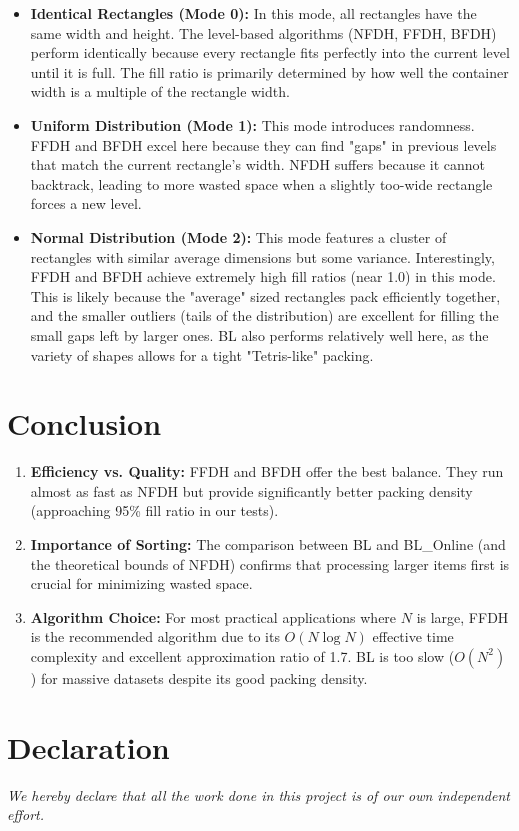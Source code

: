 \documentclass[a4paper,12pt]{article}
\begin{document}
\begin{itemize}
    \item \textbf{Identical Rectangles (Mode 0):} 
    In this mode, all rectangles have the same width and height. The level-based algorithms (NFDH, FFDH, BFDH) perform identically because every rectangle fits perfectly into the current level until it is full. The fill ratio is primarily determined by how well the container width is a multiple of the rectangle width.
    
    \item \textbf{Uniform Distribution (Mode 1):} 
    This mode introduces randomness. FFDH and BFDH excel here because they can find "gaps" in previous levels that match the current rectangle's width. NFDH suffers because it cannot backtrack, leading to more wasted space when a slightly too-wide rectangle forces a new level.
    
    \item \textbf{Normal Distribution (Mode 2):} 
    This mode features a cluster of rectangles with similar average dimensions but some variance. Interestingly, FFDH and BFDH achieve extremely high fill ratios (near 1.0) in this mode. This is likely because the "average" sized rectangles pack efficiently together, and the smaller outliers (tails of the distribution) are excellent for filling the small gaps left by larger ones. BL also performs relatively well here, as the variety of shapes allows for a tight "Tetris-like" packing.
\end{itemize}

\section{Conclusion}
\begin{enumerate}
    \item \textbf{Efficiency vs. Quality:} FFDH and BFDH offer the best balance. They run almost as fast as NFDH but provide significantly better packing density (approaching 95\% fill ratio in our tests).
    \item \textbf{Importance of Sorting:} The comparison between BL and BL\_Online (and the theoretical bounds of NFDH) confirms that processing larger items first is crucial for minimizing wasted space.
    \item \textbf{Algorithm Choice:} For most practical applications where $N$ is large, FFDH is the recommended algorithm due to its $O(N \log N)$ effective time complexity and excellent approximation ratio of 1.7. BL is too slow ($O(N^2)$) for massive datasets despite its good packing density.
\end{enumerate}

\section{Declaration}
\textit{We hereby declare that all the work done in this project is of our own independent effort.}
\end{document}

